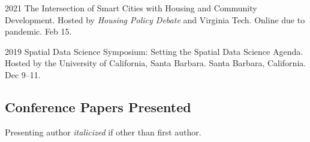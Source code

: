 \documentclass[12pt,letterpaper]{report}
\begin{document}
    \begin{tablist}

        \item[2021] \tab The Intersection of Smart Cities with Housing and Community Development. Hosted by \textit{Housing Policy Debate} and Virginia Tech. Online due to pandemic. Feb 15.

        \item[2019] \tab Spatial Data Science Symposium: Setting the Spatial Data Science Agenda. Hosted by the University of California, Santa Barbara. Santa Barbara, California. Dec 9--11.

    \end{tablist}

    \subsection*{Conference Papers Presented}

    Presenting author \textit{italicized} if other than first author.\bigskip
\end{document}
